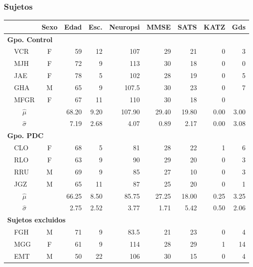 \documentclass{beamer}
\newcommand{\bordes}[1]{\renewcommand{\arraystretch}{#1}}
\begin{document}
\begin{frame}\frametitle{Sujetos}
\begin{table}
\centering
\bordes{1.1}
\begin{tiny}
\begin{tabular}{llcrrrrrrr}
\toprule
 \phantom{mm}&
 & \textbf{Sexo} & \textbf{Edad} & \textbf{Esc.} & \textbf{Neuropsi} & \textbf{MMSE} & \textbf{SATS} & \textbf{KATZ} & \textbf{Gds} \\
\midrule
\multicolumn{6}{l}{\textbf{Gpo. Control}}\\
&VCR    & F    & 59   & 12   & 107      & 29   & 21   & 0    & 3 \\
&MJH    & F    & 72   & 9    & 113      & 30   & 18   & 0    & 0 \\
&JAE    & F    & 78   & 5    & 102      & 28   & 19   & 0    & 5 \\
&GHA    & M    & 65   & 9    & 107.5    & 30   & 23   & 0    & 7 \\
&MFGR   & F    & 67   & 11   & 110      & 30   & 18   & 0    &   \\
\rowcolor{gris}
&\multicolumn{1}{c}{$\widehat{\mu}$} & 
              & 68.20& 9.20 & 107.90   & 29.40& 19.80& 0.00 & 3.00\\
\rowcolor{gris}
&\multicolumn{1}{c}{$\widehat{\sigma}$} & 
              & 7.19 & 2.68 & 4.07     & 0.89 & 2.17 & 0.00 & 3.08\\
\midrule
\multicolumn{6}{l}{\textbf{Gpo. PDC}}\\
&CLO    & F    & 68   & 5    & 81       & 28   & 22   & 1    & 6 \\
&RLO    & F    & 63   & 9    & 90       & 29   & 20   & 0    & 3 \\
&RRU    & M    & 69   & 9    & 85       & 27   & 10   & 0    & 3 \\
&JGZ    & M    & 65   & 11   & 87       & 25   & 20   & 0    & 1 \\
\rowcolor{gris}
&\multicolumn{1}{c}{$\widehat{\mu}$} & 
              & 66.25& 8.50 & 85.75   & 27.25& 18.00& 0.25 & 3.25\\
\rowcolor{gris}
&\multicolumn{1}{c}{$\widehat{\sigma}$} & 
              & 2.75 & 2.52 & 3.77    & 1.71 & 5.42 & 0.50 & 2.06\\
\midrule
\multicolumn{6}{l}{\textbf{Sujetos excluidos}}\\
&FGH    & M    & 71   & 9    & 83.5     & 21   & 23   & 0    & 4  \\
&MGG    & F    & 61   & 9    & 114      & 28   & 29   & 1    & 14 \\
&EMT    & M    & 50   & 22   & 106      & 30   & 15   & 0    & 4  \\
\bottomrule
\end{tabular} 
\end{tiny}
\end{table}
\end{frame}
\end{document}
